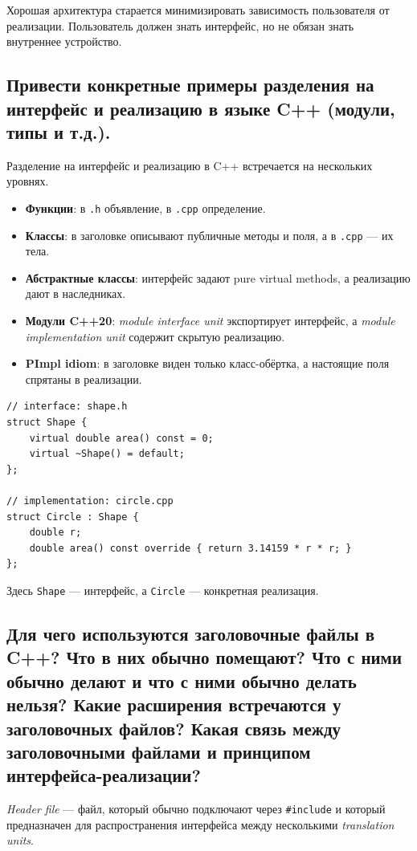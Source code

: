 \begin{remark}
Хорошая архитектура старается минимизировать зависимость пользователя от реализации. Пользователь должен знать интерфейс, но не обязан знать внутреннее устройство.
\end{remark}

\subsection{Привести конкретные примеры разделения на интерфейс и реализацию в языке C++ (модули, типы и т.д.).}
Разделение на интерфейс и реализацию в C++ встречается на нескольких уровнях.

\begin{itemize}
    \item \textbf{Функции}: в \texttt{.h} объявление, в \texttt{.cpp} определение.
    \item \textbf{Классы}: в заголовке описывают публичные методы и поля, а в \texttt{.cpp} — их тела.
    \item \textbf{Абстрактные классы}: интерфейс задают pure virtual methods, а реализацию дают в наследниках.
    \item \textbf{Модули C++20}: \textit{module interface unit} экспортирует интерфейс, а \textit{module implementation unit} содержит скрытую реализацию.
    \item \textbf{PImpl idiom}: в заголовке виден только класс-обёртка, а настоящие поля спрятаны в реализации.
\end{itemize}

\begin{example}
\begin{verbatim}
// interface: shape.h
struct Shape {
    virtual double area() const = 0;
    virtual ~Shape() = default;
};

// implementation: circle.cpp
struct Circle : Shape {
    double r;
    double area() const override { return 3.14159 * r * r; }
};
\end{verbatim}

Здесь \texttt{Shape} — интерфейс, а \texttt{Circle} — конкретная реализация.
\end{example}

\subsection{Для чего используются заголовочные файлы в C++? Что в них обычно помещают? Что с ними обычно делают и что с ними обычно делать нельзя? Какие расширения встречаются у заголовочных файлов? Какая связь между заголовочными файлами и принципом интерфейса-реализации?}
\begin{definition}
\textit{Header file} — файл, который обычно подключают через \texttt{\#include} и который предназначен для распространения интерфейса между несколькими \textit{translation units}.
\end{definition}


